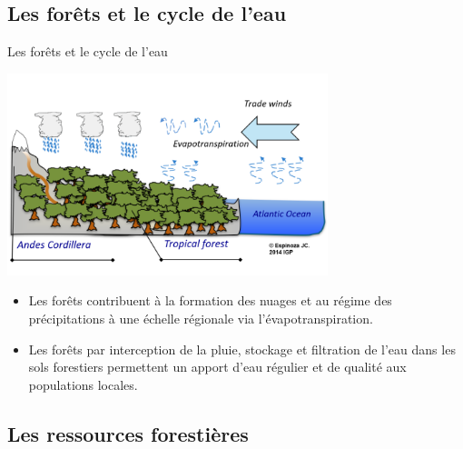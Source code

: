 \documentclass[10pt,table,dvipsnames,compress]{beamer}
\begin{document}
\subsection{Les forêts et le cycle de l'eau}
\label{sec:org7b66954}

\begin{frame}[label={sec:org66bc345}]{Les forêts et le cycle de l'eau}
\begin{center}
\includegraphics[width=0.7\textwidth]{figs/evapotranspiration-amazonie.png}
\end{center}

\begin{itemize}
\item Les forêts contribuent à la formation des nuages et au régime des précipitations à une échelle régionale via l'évapotranspiration.
\item Les forêts par interception de la pluie, stockage et filtration de l'eau dans les sols forestiers permettent un apport d'eau régulier et de qualité aux populations locales.
\end{itemize}
\end{frame}
\subsection{Les ressources forestières}
\label{sec:org0097c36}
\end{document}
